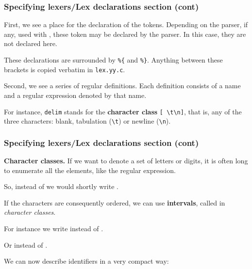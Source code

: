 %
\begin{frame}[containsverbatim]
\frametitle{Specifying lexers/Lex declarations section
(cont)}

First, we see a place for the declaration of the tokens. Depending on
the parser, if any, used with \Lex, these token may be declared by the
parser. In this case, they are not declared here.

\bigskip

These declarations are surrounded by \verb+%{+ and \verb+%}+. Anything
between these brackets is copied verbatim in \texttt{lex.yy.c}.

\bigskip

Second, we see a series of regular definitions. Each definition
consists of a name and a regular expression denoted by that name.

\bigskip

For instance, \texttt{delim} stands for the \textbf{character class}
\verb+[ \t\n]+, that is, any of the three characters: blank,
tabulation (\verb+\t+) or newline (\verb+\n+).

\end{frame}

%
\begin{frame}
\frametitle{Specifying lexers/Lex declarations section
(cont)}

\textbf{Character classes.} If we want to denote a set of letters
or digits, it is often long to enumerate all the elements, like
the  regular expression.

\bigskip

So, instead of  \disj {} \disj {} we would shortly
write \lb{}\rb.

\bigskip

If the characters are consequently ordered, we can use
\textbf{intervals}, called in \Lex \emph{character classes}.

\bigskip

For instance we write \lb{}\dash{}\rb{} instead
of  \disj {} \disj {}.

\bigskip

Or \lb{}\dash{}\rb{} instead of  \disj {} \disj
{} \disj {} \disj {} \disj {} \disj {} \disj
{} \disj {} \disj {}.

\bigskip

We can now describe identifiers in a very compact way:
\begin{center}
\lb{}\dash{}\dash{}\rb\lb{}\dash{}\dash{}\dash{}\rb\kleene
\end{center}

\end{frame}

